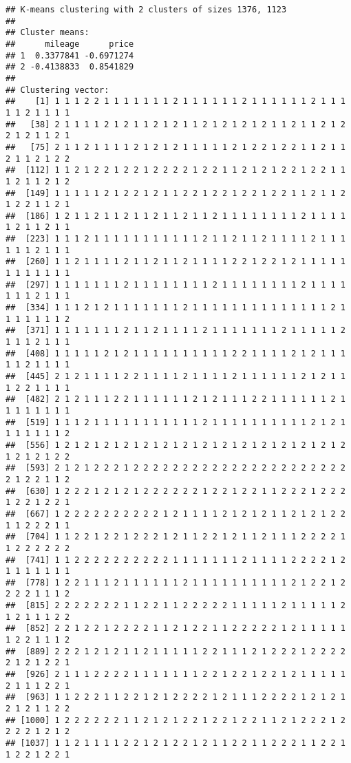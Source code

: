 \documentclass[
]{article}
\begin{document}
\begin{verbatim}
## K-means clustering with 2 clusters of sizes 1376, 1123
## 
## Cluster means:
##      mileage      price
## 1  0.3377841 -0.6971274
## 2 -0.4138833  0.8541829
## 
## Clustering vector:
##    [1] 1 1 1 2 2 1 1 1 1 1 1 1 2 1 1 1 1 1 1 2 1 1 1 1 1 1 2 1 1 1 1 1 2 1 1 1 1
##   [38] 2 1 1 1 1 2 1 2 1 1 2 1 2 1 1 2 1 2 1 2 1 2 1 1 2 1 1 2 1 2 2 1 2 1 1 2 1
##   [75] 2 1 1 2 1 1 1 1 2 1 2 1 2 1 1 1 1 1 2 1 2 2 1 2 2 1 1 2 1 1 2 1 1 2 1 2 2
##  [112] 1 1 2 1 2 2 1 2 2 1 2 2 2 2 1 2 2 1 1 2 1 2 1 2 2 1 2 2 1 1 1 2 1 1 2 1 2
##  [149] 1 1 1 1 1 2 1 2 2 1 2 1 1 2 2 1 2 2 1 2 2 1 2 2 1 1 2 1 1 2 1 2 2 1 1 2 1
##  [186] 1 2 1 1 2 1 1 2 1 1 2 1 1 2 1 1 2 1 1 1 1 1 1 1 1 2 1 1 1 1 1 2 1 1 2 1 1
##  [223] 1 1 1 2 1 1 1 1 1 1 1 1 1 1 1 2 1 1 2 1 1 2 1 1 1 1 2 1 1 1 1 1 1 2 1 1 1
##  [260] 1 1 2 1 1 1 1 2 1 1 2 1 1 2 1 1 1 1 2 2 1 2 2 1 2 1 1 1 1 1 1 1 1 1 1 1 1
##  [297] 1 1 1 1 1 1 1 2 1 1 1 1 1 1 1 1 2 1 1 1 1 1 1 1 1 2 1 1 1 1 1 1 1 2 1 1 1
##  [334] 1 1 1 2 1 2 1 1 1 1 1 1 1 2 1 1 1 1 1 1 1 1 1 1 1 1 1 1 2 1 1 1 1 1 1 1 2
##  [371] 1 1 1 1 1 1 1 2 1 1 2 1 1 1 1 2 1 1 1 1 1 1 1 2 1 1 1 1 1 2 1 1 1 2 1 1 1
##  [408] 1 1 1 1 1 2 1 2 1 1 1 1 1 1 1 1 1 1 2 2 1 1 1 1 2 1 2 1 1 1 1 1 2 1 1 1 1
##  [445] 2 1 2 1 1 1 1 2 2 1 1 1 1 2 1 1 1 1 2 1 1 1 1 1 1 2 1 2 1 1 1 2 2 1 1 1 1
##  [482] 2 1 2 1 1 1 2 2 1 1 1 1 1 1 2 1 2 1 1 1 2 2 1 1 1 1 1 1 2 1 1 1 1 1 1 1 1
##  [519] 1 1 1 2 1 1 1 1 1 1 1 1 1 1 1 2 1 1 1 1 1 1 1 1 1 1 2 1 2 1 1 1 1 1 1 1 2
##  [556] 1 2 1 2 1 2 1 2 1 2 1 2 1 2 1 2 1 2 1 2 1 2 1 2 1 2 1 2 1 2 1 2 1 2 1 2 2
##  [593] 2 1 2 1 2 2 2 1 2 2 2 2 2 2 2 2 2 2 2 2 2 2 2 2 2 2 2 2 2 2 2 1 2 2 1 1 2
##  [630] 1 2 2 2 1 2 1 2 1 2 2 2 2 2 2 1 2 2 1 2 2 1 1 2 2 2 1 2 2 2 1 2 2 1 2 2 1
##  [667] 1 2 2 2 2 2 2 2 2 2 2 1 2 1 1 1 1 2 1 2 1 2 1 1 2 1 2 1 2 2 1 1 2 2 2 1 1
##  [704] 1 1 2 2 1 2 2 1 2 2 2 1 2 1 1 2 2 1 2 1 1 2 1 1 1 2 2 2 2 1 1 2 2 2 2 2 2
##  [741] 1 1 2 2 2 2 2 2 2 2 2 2 1 1 1 1 1 1 1 2 1 1 1 1 2 2 2 2 1 2 1 1 1 1 1 1 1
##  [778] 1 2 2 1 1 1 2 1 1 1 1 1 1 2 1 1 1 1 1 1 1 1 1 1 2 1 2 2 1 2 2 2 2 1 1 1 2
##  [815] 2 2 2 2 2 2 2 1 1 2 2 1 1 2 2 2 2 2 1 1 1 1 1 2 1 1 1 1 1 2 1 2 1 1 1 2 2
##  [852] 2 2 1 2 2 1 2 2 2 2 1 1 2 1 2 2 1 1 2 2 2 2 2 1 2 1 1 1 1 1 1 2 2 1 1 1 2
##  [889] 2 2 2 1 2 1 2 1 1 2 1 1 1 1 1 2 2 1 1 1 2 1 2 2 2 1 2 2 2 2 2 1 2 1 2 2 1
##  [926] 2 1 1 1 2 2 2 2 1 1 1 1 1 1 1 2 2 1 2 2 1 2 2 1 2 1 1 1 1 1 2 1 1 1 2 2 1
##  [963] 1 1 2 2 2 1 1 2 2 1 2 1 2 2 2 2 1 2 1 1 1 2 2 2 2 1 2 1 2 1 2 1 2 1 1 2 2
## [1000] 1 2 2 2 2 2 2 1 1 2 1 2 1 2 2 1 2 2 1 2 2 1 1 2 1 2 2 2 1 2 2 2 2 1 2 1 2
## [1037] 1 1 2 1 1 1 1 2 2 1 2 1 2 2 1 2 1 1 2 2 1 1 2 2 2 1 1 2 2 1 1 2 2 1 2 2 1

\end{verbatim}
\end{document}
